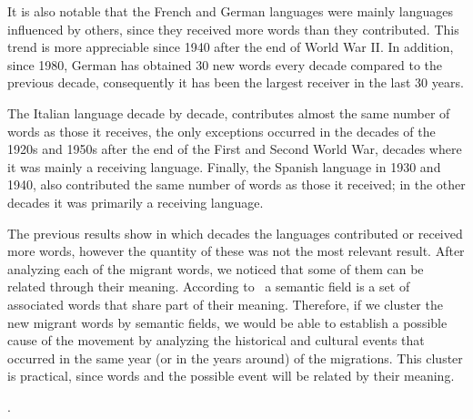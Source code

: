 \documentclass[10pt,letterpaper]{article} %
\begin{document}
It is also notable that the French and German languages were mainly languages
influenced by others, since they received more words than they contributed.
This trend is more appreciable since 1940 after the end of World War II. In
addition, since 1980, German has obtained 30 new words every decade compared to
the previous decade, consequently it has been the largest receiver in the last
30 years.

The Italian language decade by decade, contributes almost the same number of
words as those it receives, the only exceptions occurred in the decades of the
1920s and 1950s after the end of the First and Second World War, decades where
it was mainly a receiving language. Finally, the Spanish language in 1930 and
1940, also contributed the same number of words as those it received; in the
other decades it was primarily a receiving language.


The previous results show in which decades the languages
contributed or received more words, however the quantity of these was not the
most relevant result. After analyzing each of the migrant words, we noticed
that some of them can be related through their meaning. According
to~\cite{semantic_oxford} a semantic field is a set of associated words that
share part of their meaning. Therefore, if we cluster the new migrant words  by
semantic fields, we would be able to establish a possible cause of the movement
by analyzing the historical and cultural events that occurred  in the same year
(or in the years around) of the migrations. This cluster is practical, since
words and the possible event will be related by their meaning. 


. 
\end{document}
